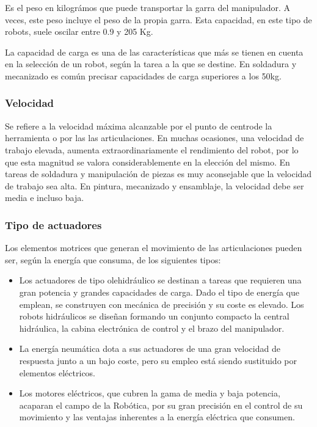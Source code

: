 \documentclass[12pt,a4paper]{report}
\begin{document}
Es el peso en kilográmos que puede transportar la garra del manipulador. A
veces, este peso incluye el peso de la propia garra. Esta capacidad, en este
tipo de robots, suele oscilar entre 0.9 y 205 Kg. 

La capacidad de carga es una de las características que más se tienen en
cuenta en la selección de un robot, según la tarea a la que se destine. En
soldadura y mecanizado es común precisar capacidades de carga superiores a los
50kg.


\subsubsection{Velocidad}

Se refiere a la velocidad máxima alcanzable por el punto de centrode la
herramienta o por las las articulaciones.
En muchas ocasiones, una velocidad de trabajo elevada, aumenta
extraordinariamente el rendimiento del robot, por lo que esta magnitud se valora
considerablemente en la elección del mismo. En tareas de soldadura y
manipulación de piezas es muy aconsejable que la velocidad de trabajo sea alta.
En pintura, mecanizado y ensamblaje, la velocidad debe ser media e incluso baja.


\subsubsection{Tipo de actuadores}

Los elementos motrices que generan el movimiento de las articulaciones pueden
ser, según la energía que consuma, de los siguientes tipos:

\begin{itemize}
    \item Los actuadores de tipo olehidráulico se destinan a tareas que requieren una gran
    potencia y grandes capacidades de carga. Dado el tipo de energía que emplean, se
    construyen con mecánica de precisión y su coste es elevado. Los robots
    hidráulicos se diseñan formando un conjunto compacto la central hidráulica, la
    cabina electrónica de control y el brazo del manipulador.
    \item La energía neumática dota a sus actuadores de una gran velocidad de respuesta
    junto a un bajo coste, pero su empleo está siendo sustituido por elementos
    eléctricos.
    \item Los motores eléctricos, que cubren la gama de media y baja potencia, acaparan el
    campo de la Robótica, por su gran precisión en el control de su movimiento y las
    ventajas inherentes a la energía eléctrica que consumen.
\end{itemize}
\end{document}
